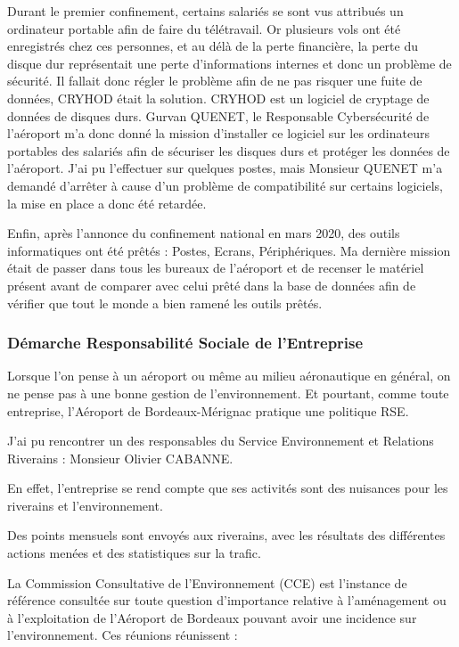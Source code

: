 Durant le premier confinement, certains salariés se sont vus attribués un ordinateur portable afin de faire du télétravail. Or plusieurs vols ont été enregistrés chez ces personnes, et au délà de la perte financière, la perte du disque dur représentait une perte d'informations internes et donc un problème de sécurité.
Il fallait donc régler le problème afin de ne pas risquer une fuite de données, CRYHOD était la solution. CRYHOD est un logiciel de cryptage de données de disques durs.
Gurvan QUENET, le Responsable Cybersécurité de l'aéroport m'a donc donné la mission d'installer ce logiciel sur les ordinateurs portables des salariés afin de sécuriser les disques durs et protéger les données de l'aéroport.
J'ai pu l'effectuer sur quelques postes, mais Monsieur QUENET m'a demandé d'arrêter à cause d'un problème de compatibilité sur certains logiciels, la mise en place a donc été retardée.\newline

Enfin, après l'annonce du confinement national en mars 2020, des outils informatiques ont été prêtés : Postes, Ecrans, Périphériques.
Ma dernière mission était de passer dans tous les bureaux de l'aéroport et de recenser le matériel présent avant de comparer avec celui prêté dans la base de données afin de vérifier que tout le monde a bien ramené les outils prêtés.

\newpage

\subsubsection*{Démarche Responsabilité Sociale de l’Entreprise}


Lorsque l'on pense à un aéroport ou même au milieu aéronautique en général, on ne pense pas à une bonne gestion de l'environnement.
Et pourtant, comme toute entreprise, l'Aéroport de Bordeaux-Mérignac pratique une politique RSE.

J'ai pu rencontrer un des responsables du Service Environnement et Relations Riverains : Monsieur Olivier CABANNE.

En effet, l'entreprise se rend compte que ses activités sont des nuisances pour les riverains et l'environnement. 

Des points mensuels sont envoyés aux riverains, avec les résultats des différentes actions menées et des statistiques sur la trafic.

La Commission Consultative de l’Environnement (CCE) est l’instance de référence consultée sur toute question d’importance relative à l’aménagement ou à l’exploitation de l’Aéroport de Bordeaux pouvant avoir une incidence sur l’environnement. Ces réunions réunissent : 

